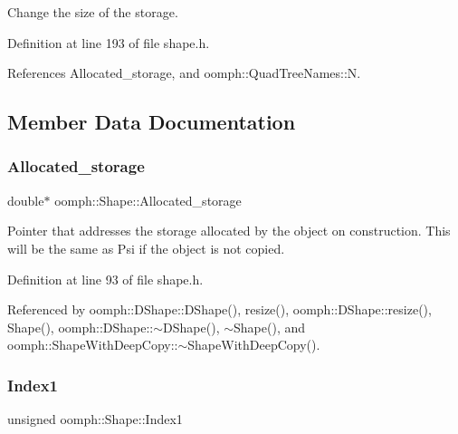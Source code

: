 Change the size of the storage. 



Definition at line 193 of file shape.\+h.



References Allocated\+\_\+storage, and oomph\+::\+Quad\+Tree\+Names\+::N.



\subsection{Member Data Documentation}
\mbox{\label{classoomph_1_1Shape_a32c202fd82d361e354d7cf19615f162f}} 
\subsubsection{\texorpdfstring{Allocated\+\_\+storage}{Allocated\_storage}}
{\footnotesize\ttfamily double$\ast$ oomph\+::\+Shape\+::\+Allocated\+\_\+storage\hspace{0.3cm}{\ttfamily [protected]}}



Pointer that addresses the storage allocated by the object on construction. This will be the same as Psi if the object is not copied. 



Definition at line 93 of file shape.\+h.



Referenced by oomph\+::\+D\+Shape\+::\+D\+Shape(), resize(), oomph\+::\+D\+Shape\+::resize(), Shape(), oomph\+::\+D\+Shape\+::$\sim$\+D\+Shape(), $\sim$\+Shape(), and oomph\+::\+Shape\+With\+Deep\+Copy\+::$\sim$\+Shape\+With\+Deep\+Copy().

\mbox{\label{classoomph_1_1Shape_a63638007c6e3b84b57a023432c43ceb1}} 
\subsubsection{\texorpdfstring{Index1}{Index1}}
{\footnotesize\ttfamily unsigned oomph\+::\+Shape\+::\+Index1\hspace{0.3cm}{\ttfamily [protected]}}



